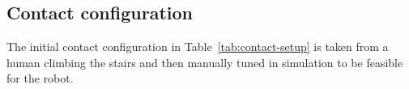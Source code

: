 \label{sec:optimal_control}

\subsection*{Contact configuration}

The initial contact configuration in Table~\ref{tab:contact-setup} is taken from a human climbing the stairs and then manually tuned in simulation to be feasible for the robot.




